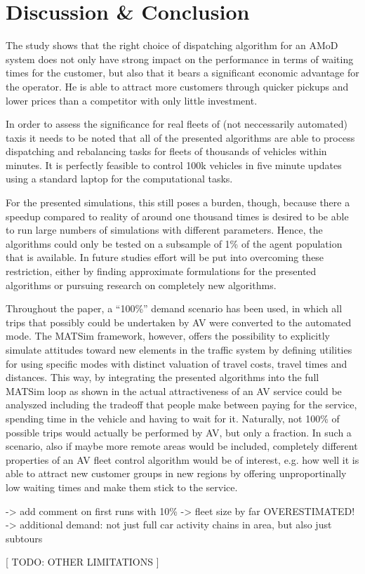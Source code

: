 \section{Discussion \& Conclusion}
\label{sec:Conclusion}

The study shows that the right choice of dispatching algorithm for an AMoD system
does not only have strong impact on the performance in terms of waiting times for
the customer, but also that it bears a significant economic advantage for the
operator. He is able to attract more customers through quicker pickups and
lower prices than a competitor with only little investment.

In order to assess the significance for real fleets of (not neccessarily
automated) taxis it needs to be noted that all of the presented algorithms are
able to process dispatching and rebalancing tasks for fleets of thousands of
vehicles within minutes. It is perfectly feasible to control 100k vehicles in
five minute updates using a standard laptop for the computational tasks.

For the presented simulations, this still poses a burden, though, because there
a speedup compared to reality of around one thousand times is desired to be able
to run large numbers of simulations with different parameters. Hence, the algorithms
could only be tested on a subsample of 1\% of the agent population that is available.
In future studies effort will be put into overcoming these restriction, either
by finding approximate formulations for the presented algorithms or pursuing research
on completely new algorithms.

Throughout the paper, a ``100\%'' demand scenario has been used, in which all
trips that possibly could be undertaken by AV were converted to the automated
mode. The MATSim framework, however, offers the possibility to explicitly
simulate attitudes toward new elements in the traffic system by defining utilities
for using specific modes with distinct valuation of travel costs, travel times and
distances. This way, by integrating the presented algorithms into the full
MATSim loop as shown in \cite{horl_abmtrans17} the actual attractiveness of an
AV service could be analyszed including the tradeoff that people make between
paying for the service, spending time in the vehicle and having to wait for it.
Naturally, not 100\% of possible trips would actually be performed by AV, but only
a fraction. In such a scenario, also if maybe more remote areas would be included,
completely different properties of an AV fleet control algorithm would be of
interest, e.g. how well it is able to attract new customer groups in new regions
by offering unproportinally low waiting times and make them stick to the service.

-> add comment on first runs with 10\% -> fleet size by far OVERESTIMATED!
-> additional demand: not just full car activity chains in area, but also just subtours



[ TODO: OTHER LIMITATIONS ]
